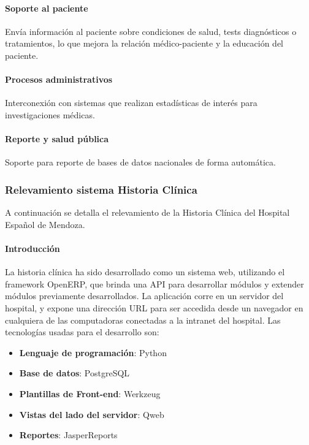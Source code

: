 \paragraph{Soporte al paciente}

Envía información al paciente sobre condiciones de salud, tests diagnósticos o tratamientos, lo que mejora la relación médico-paciente y la educación del paciente.

\paragraph{Procesos administrativos}

Interconexión con sistemas que realizan estadísticas de interés para investigaciones médicas.

\paragraph{Reporte y salud pública}

Soporte para reporte de bases de datos nacionales de forma automática.

\subsubsection{Relevamiento sistema Historia Clínica}
A continuación se detalla el relevamiento de la Historia Clínica del Hospital Español de Mendoza.

\paragraph{Introducción}

La historia clínica ha sido desarrollado como un sistema web, utilizando el framework OpenERP, que brinda una API para desarrollar módulos y extender módulos previamente desarrollados.
La aplicación corre en un servidor del hospital, y expone una dirección URL para ser accedida desde un navegador en cualquiera de las computadoras conectadas a la intranet del hospital.
Las tecnologías usadas para el desarrollo son:

\begin{itemize}
    \item \textbf{Lenguaje de programación}: Python
    \item \textbf{Base de datos}: PostgreSQL
    \item \textbf{Plantillas de Front-end}: Werkzeug
    \item \textbf{Vistas del lado del servidor}: Qweb
    \item \textbf{Reportes}: JasperReports
\end{itemize}

